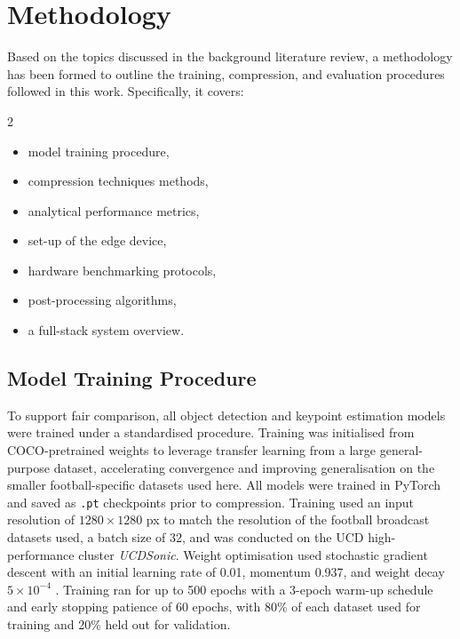\section{Methodology}
\label{sec:methodology}
Based on the topics discussed in the background literature review, a methodology has been formed to outline the training, compression, and evaluation procedures followed in this work. Specifically, it covers:

\begin{multicols}{2}
\begin{itemize}
    \item model training procedure,
    \item compression techniques methods,
    \item analytical performance metrics,
    \item set-up of the edge device,
    \item hardware benchmarking protocols,
    \item post-processing algorithms,
    \item a full-stack system overview.
\end{itemize}
\end{multicols}

\subsection{Model Training Procedure}
\label{subsec:training}

To support fair comparison, all object detection and keypoint estimation models were trained under a standardised procedure. Training was initialised from COCO-pretrained weights \cite{lin2015microsoftcococommonobjects} to leverage transfer learning from a large general-purpose dataset, accelerating convergence and improving generalisation on the smaller football-specific datasets used here. All models were trained in PyTorch and saved as \verb|.pt| checkpoints prior to compression. Training used an input resolution of $1280 \times 1280$ px to match the resolution of the football broadcast datasets used, a batch size of 32, and was conducted on the UCD high-performance cluster \textit{UCDSonic}. Weight optimisation used stochastic gradient descent with an initial learning rate of 0.01, momentum 0.937, and weight decay $5\times10^{-4}$ \cite{ultralytics_cfg}. Training ran for up to 500 epochs with a 3-epoch warm-up schedule and early stopping patience of 60 epochs, with 80\% of each dataset used for training and 20\% held out for validation.

